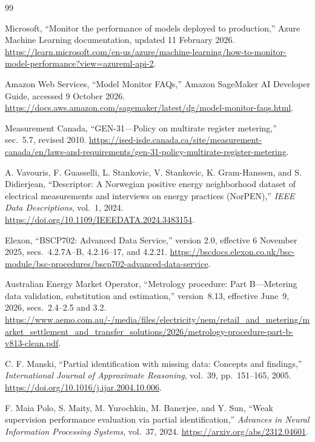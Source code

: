 \documentclass[12pt]{article}
\begin{document}
\FloatBarrier
\begin{thebibliography}{99}

 Microsoft, ``Monitor the performance of models deployed
to production,'' Azure Machine Learning documentation, updated 11 February
2026. \url{https://learn.microsoft.com/en-us/azure/machine-learning/how-to-monitor-model-performance?view=azureml-api-2}.

 Amazon Web Services, ``Model Monitor FAQs,'' Amazon
SageMaker AI Developer Guide, accessed 9 October 2026.
\url{https://docs.aws.amazon.com/sagemaker/latest/dg/model-monitor-faqs.html}.

 Measurement Canada, ``GEN-31---Policy on multirate register
metering,'' sec.~5.7, revised 2010.
\url{https://ised-isde.canada.ca/site/measurement-canada/en/laws-and-requirements/gen-31-policy-multirate-register-metering}.

 A. Vavouris, F. Guasselli, L. Stankovic, V. Stankovic,
K. Gram-Hanssen, and S. Didierjean, ``Descriptor: A Norwegian positive
energy neighborhood dataset of electrical measurements and interviews on
energy practices (NorPEN),'' \emph{IEEE Data Descriptions}, vol.~1, 2024.
\url{https://doi.org/10.1109/IEEEDATA.2024.3483154}.

 Elexon, ``BSCP702: Advanced Data Service,'' version 2.0,
effective 6 November 2025, secs.~4.2.7A--B, 4.2.16--17, and 4.2.21.
\url{https://bscdocs.elexon.co.uk/bsc-module/bsc-procedures/bscp702-advanced-data-service}.

 Australian Energy Market Operator,
``Metrology procedure: Part B---Metering data validation, substitution
and estimation,'' version~8.13, effective June~9, 2026,
secs.~2.4--2.5 and 3.2.
\url{https://www.aemo.com.au/-/media/files/electricity/nem/retail_and_metering/market_settlement_and_transfer_solutions/2026/metrology-procedure-part-b-v813-clean.pdf}.

 C. F. Manski, ``Partial identification with missing data:
Concepts and findings,'' \emph{International Journal of Approximate
Reasoning}, vol.~39, pp.~151--165, 2005.
\url{https://doi.org/10.1016/j.ijar.2004.10.006}.

 F. Maia Polo, S. Maity, M. Yurochkin, M. Banerjee, and
Y. Sun, ``Weak supervision performance evaluation via partial
identification,'' \emph{Advances in Neural Information Processing
Systems}, vol.~37, 2024. \url{https://arxiv.org/abs/2312.04601}.


\end{thebibliography}
\end{document}

